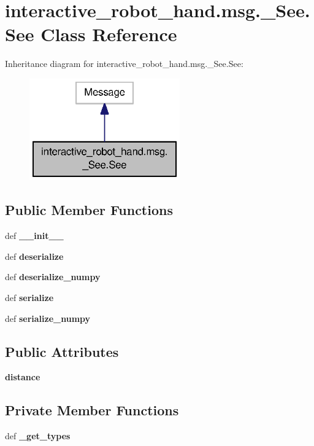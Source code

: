 \section{interactive\-\_\-robot\-\_\-hand.\-msg.\-\_\-\-See.\-See Class Reference}
\label{classinteractive__robot__hand_1_1msg_1_1__See_1_1See}


Inheritance diagram for interactive\-\_\-robot\-\_\-hand.\-msg.\-\_\-\-See.\-See\-:
\nopagebreak
\begin{figure}[H]
\begin{center}
\leavevmode
\includegraphics[width=184pt]{classinteractive__robot__hand_1_1msg_1_1__See_1_1See__inherit__graph}
\end{center}
\end{figure}
\subsection*{Public Member Functions}
\begin{DoxyCompactItemize}
\item 
def {\bf \-\_\-\-\_\-init\-\_\-\-\_\-}
\item 
def {\bf deserialize}
\item 
def {\bf deserialize\-\_\-numpy}
\item 
def {\bf serialize}
\item 
def {\bf serialize\-\_\-numpy}
\end{DoxyCompactItemize}
\subsection*{Public Attributes}
\begin{DoxyCompactItemize}
\item 
{\bf distance}
\end{DoxyCompactItemize}
\subsection*{Private Member Functions}
\begin{DoxyCompactItemize}
\item 
def {\bf \-\_\-get\-\_\-types}
\end{DoxyCompactItemize}
